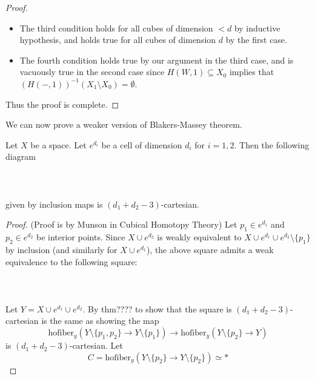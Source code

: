 \documentclass[a4paper]{article}
\begin{document}
\begin{lmm}{}{}
\begin{proof}
\begin{itemize}
\item The third condition holds for all cubes of dimension $<d$ by inductive hypothesis, and holds true for all cubes of dimension $d$ by the first case. 
\item The fourth condition holds true by our argument in the third case, and is vacuously true in the second case since $H(W,1)\subseteq X_0$ implies that $(H(-,1))^{-1}(X_1\setminus X_0)=\emptyset$. 
\end{itemize}
Thus the proof is complete. 
\end{proof}
\end{lmm}

We can now prove a weaker version of Blakers-Massey theorem. 

\begin{prp}{}{} Let $X$ be a space. Let $e^{d_i}$ be a cell of dimension $d_i$ for $i=1,2$. Then the following diagram \\~\\
\\~\\
given by inclusion maps is $(d_1+d_2-3)$-cartesian. 
\begin{proof}
(Proof is by Munson in Cubical Homotopy Theory) Let $p_1\in e^{d_1}$ and $p_2\in e^{d_2}$ be interior points. Since $X\cup e^{d_2}$ is weakly equivalent to $X\cup e^{d_1}\cup e^{d_2}\setminus\{p_1\}$ by inclusion (and similarly for $X\cup e^{d_1}$), the above square admits a weak equivalence to the following square: \\~\\
\\~\\
Let $Y=X\cup e^{d_1}\cup e^{d_2}$. By thm???? to show that the square is $(d_1+d_2-3)$-cartesian is the same as showing the map $$\text{hofiber}_y(Y\setminus\{p_1,p_2\}\to Y\setminus\{p_1\})\to\text{hofiber}_y(Y\setminus\{p_2\}\to Y)$$ is $(d_1+d_2-3)$-cartesian. Let $$C=\text{hofiber}_y(Y\setminus\{p_2\}\to Y\setminus\{p_2\})\simeq\ast$$ 


\end{proof}
\end{prp}
\end{document}
